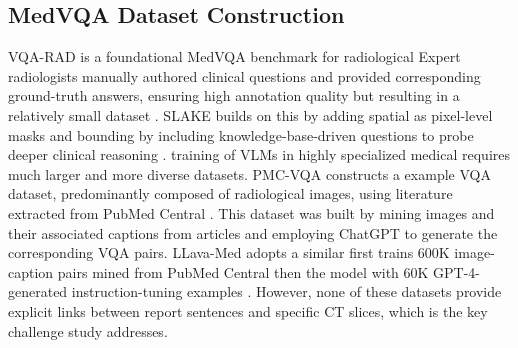 \documentclass[bioengineering,article,submit,pdftex,moreauthors]{Definitions/mdpi}
\begin{document}
\subsection{MedVQA Dataset Construction}
VQA-RAD is a foundational MedVQA benchmark for radiological  
Expert radiologists manually authored clinical questions and provided corresponding ground-truth answers, ensuring high annotation quality but resulting in a relatively small dataset \cite{lau_dataset_2018}. 
SLAKE builds on this by adding spatial  as pixel-level masks and bounding  by including knowledge-base-driven questions to probe deeper clinical reasoning \cite{liu_slake_2021}.
 training of VLMs in highly specialized medical  requires much larger and more diverse datasets. 
PMC-VQA constructs a  example VQA dataset, predominantly composed of radiological images, using literature extracted from PubMed Central \cite{zhang_pmc-vqa_2024}.
This dataset was built by mining images and their associated captions from articles and employing ChatGPT to generate the corresponding VQA pairs.
LLava-Med adopts a similar   first trains 600K image-caption pairs mined from PubMed Central  then  the model with 60K GPT-4-generated instruction-tuning examples \cite{li_llava-med_2023}.
However, none of these datasets provide explicit links between report sentences and specific CT slices, which is the key challenge  study addresses.

\end{document}
